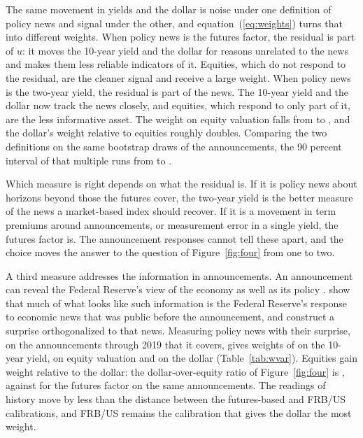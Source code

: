 The same movement in yields and the dollar is noise under one definition of policy news and signal under the other, and equation~(\ref{eq:weights}) turns that into different weights. When policy news is the futures factor, the residual is part of $u$: it moves the 10-year yield and the dollar for reasons unrelated to the news and makes them less reliable indicators of it. Equities, which do not respond to the residual, are the cleaner signal and receive a large weight. When policy news is the two-year yield, the residual is part of the news. The 10-year yield and the dollar now track the news closely, and equities, which respond to only part of it, are the less informative asset. The weight on equity valuation falls from  to , and the dollar's weight relative to equities roughly doubles. Comparing the two definitions on the same bootstrap draws of the announcements, the 90 percent interval of that multiple runs from  to .

Which measure is right depends on what the residual is. If it is policy news about horizons beyond those the futures cover, the two-year yield is the better measure of the news a market-based index should recover. If it is a movement in term premiums around announcements, or measurement error in a single yield, the futures factor is. The announcement responses cannot tell these apart, and the choice moves the answer to the question of Figure~\ref{fig:four} from one to two.

A third measure addresses the information in announcements. An announcement can reveal the Federal Reserve's view of the economy as well as its policy \citep{nakamura2018}. \citet{bauer2023aer} show that much of what looks like such information is the Federal Reserve's response to economic news that was public before the announcement, and \citet{bauer2023} construct a surprise orthogonalized to that news. Measuring policy news with their surprise, on the  announcements through 2019 that it covers, gives weights of  on the 10-year yield,  on equity valuation and  on the dollar (Table~\ref{tab:wvar}). Equities gain weight relative to the dollar: the dollar-over-equity ratio of Figure~\ref{fig:four} is , against  for the futures factor on the same announcements. The readings of history move by less than the distance between the futures-based and FRB/US calibrations, and FRB/US remains the calibration that gives the dollar the most weight.

